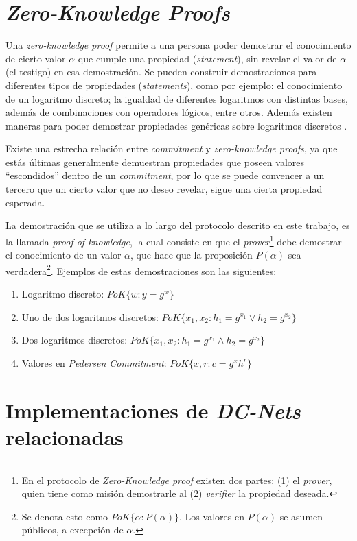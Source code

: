 \section{\emph{Zero-Knowledge Proofs}}

Una \emph{zero-knowledge proof} permite a una persona poder demostrar el conocimiento de cierto valor $\alpha$ que cumple una propiedad 
  (\emph{statement}), sin revelar el valor de $\alpha$ (el testigo) en esa demostración.
Se pueden construir demostraciones para diferentes tipos de propiedades (\emph{statements}), como por ejemplo: el conocimiento de 
un logaritmo discreto; la igualdad de diferentes logaritmos con distintas bases, además de combinaciones con operadores 
lógicos, entre otros. Además existen maneras para poder demostrar propiedades genéricas sobre logaritmos discretos \cite{camenisch1997proof}.
  
Existe una estrecha relación entre \emph{commitment} y \emph{zero-knowledge proofs}, ya que estás últimas generalmente demuestran 
propiedades que poseen valores ``escondidos'' dentro de un \emph{commitment}, por lo que se puede convencer a un tercero que un cierto 
valor que no deseo revelar, sigue una cierta propiedad esperada.

La demostración que se utiliza a lo largo del protocolo descrito en este trabajo, es la llamada \emph{proof-of-knowledge}, la cual 
consiste en que el \emph{prover}\footnote{En el protocolo de \emph{Zero-Knowledge proof} existen dos partes: (1) el 
\emph{prover}, quien tiene 
como misión demostrarle al (2) \emph{verifier} la propiedad deseada.}  debe demostrar el conocimiento de un valor $\alpha$, 
que hace que la proposición $P(\alpha)$ sea verdadera\footnote{Se denota esto como $PoK\{\alpha : P(\alpha)\}$. 
Los valores en $P(\alpha)$ se asumen públicos, a excepción de $\alpha$.}. 
Ejemplos de estas demostraciones son las siguientes:
\begin{enumerate}
  \item Logaritmo discreto: $PoK\{w : y = g^w\}$
  \item Uno de dos logaritmos discretos: $PoK\{x_1, x_2 : h_1 = g^{x_1} \lor h_2 = g^{x_2}\}$
  \item Dos logaritmos discretos: $PoK\{x_1, x_2 : h_1 = g^{x_1} \land h_2 = g^{x_2}\}$
  \item Valores en \emph{Pedersen Commitment}: $PoK\{x, r : c = g^x h^r\}$
\end{enumerate}

\section{Implementaciones de \emph{DC-Nets} relacionadas}

